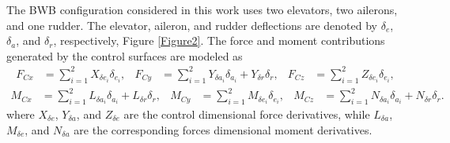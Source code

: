 \documentclass[10pt]{article}
\begin{document}

The BWB configuration considered in this work uses two
elevators, two ailerons, and one rudder. The elevator, aileron, and
rudder deflections are denoted by $\delta_e$, $\delta_a$, and
$\delta_r$, respectively, Figure \ref{Figure2}. The force and moment contributions generated
by the control surfaces are modeled as
\begin{align}
    F_{Cx} &= \sum_{i=1}^{2} X_{\delta e_i}\delta_{e_i},
    &
    F_{Cy} &= \sum_{i=1}^{2} Y_{\delta a_i}\delta_{a_i}
             +Y_{\delta r}\delta_r,
    &
    F_{Cz} &= \sum_{i=1}^{2} Z_{\delta e_i}\delta_{e_i},
\end{align}
\begin{align}
    M_{Cx} &= \sum_{i=1}^{2} L_{\delta a_i}\delta_{a_i}
             +L_{\delta r}\delta_r,
    &
    M_{Cy} &= \sum_{i=1}^{2} M_{\delta e_i}\delta_{e_i},
    &
    M_{Cz} &= \sum_{i=1}^{2} N_{\delta a_i}\delta_{a_i}
             +N_{\delta r}\delta_r.
\end{align}
where $X_{\delta e}$, $Y_{\delta a}$, and $Z_{\delta e}$ are the control
dimensional force derivatives, while $L_{\delta a}$, $M_{\delta e}$, and
$N_{\delta a}$ are the corresponding forces dimensional moment derivatives. 
%
\end{document}
